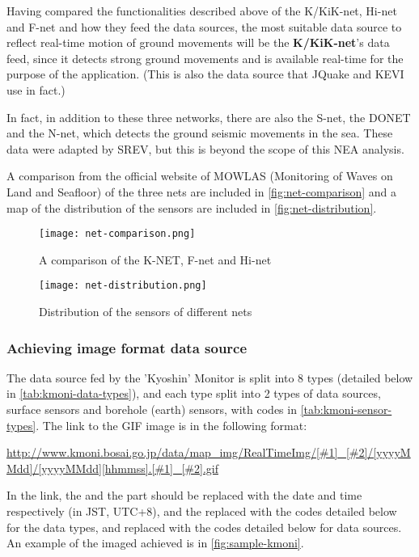 Having compared the functionalities described above of the K/KiK-net, Hi-net and F-net and how they feed the data sources, the most suitable data source to reflect real-time motion of ground movements will be the \textbf{K/KiK-net}'s data feed, since it detects strong ground movements and is available real-time for the purpose of the application. (This is also the data source that JQuake and KEVI use in fact.)

In fact, in addition to these three networks, there are also the S-net, the DONET and the N-net, which detects the ground seismic movements in the sea. These data were adapted by SREV, but this is beyond the scope of this NEA analysis.

A comparison from the official website of MOWLAS (Monitoring of Waves on Land and Seafloor) \autocite{nied-mowlas} of the three nets are included in \autoref{fig:net-comparison} and a map of the distribution of the sensors are included in \autoref{fig:net-distribution}.

\begin{figure}[htp]
    \centering
    \texttt{[image: net-comparison.png]}
    \caption{A comparison of the K-NET, F-net and Hi-net}
    \label{fig:net-comparison}
\end{figure}

\begin{figure}[htp]
    \centering
    \texttt{[image: net-distribution.png]}
    \caption{Distribution of the sensors of different nets}
    \label{fig:net-distribution}
\end{figure}

\subsubsection{Achieving image format data source}

The data source fed by the 'Kyoshin' Monitor is split into 8 types (detailed below in \autoref{tab:kmoni-data-types}), and each type split into 2 types of data sources, surface sensors and borehole (earth) sensors, with codes in \autoref{tab:kmoni-sensor-types}. The link to the GIF image is in the following format:

\begin{center}
    \url{http://www.kmoni.bosai.go.jp/data/map_img/RealTimeImg/[#1]_[#2]/[yyyyMMdd]/[yyyyMMdd][hhmmss].[#1]_[#2].gif}
\end{center}

In the link, the \Code{[yyyyMMdd]} and the \Code{[hhmmss]} part should be replaced with the date and time respectively (in JST, UTC+8), and the  replaced with the codes detailed below for the data types, and  replaced with the codes detailed below for data sources. An example of the imaged achieved is in \autoref{fig:sample-kmoni}.

